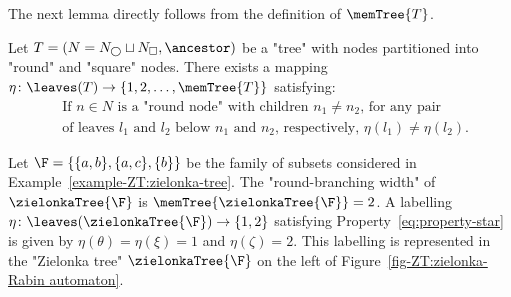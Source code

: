 \documentclass{theoretics}
\begin{document}
The next lemma directly follows from the definition of $\memTree{T}$.
\begin{lemma}\label{lemma:property_star}
	Let $T = (N = N_{\bigcirc} \sqcup N_\Box, \ancestor)$ be a "tree" with nodes partitioned into "round" and "square" nodes.
	There exists a mapping $\eta\colon \leaves(T) \to \{1,2,\dots, \memTree{T}\}$ satisfying:
	\begin{align}\label{eq:property-star}
		\nonumber&\text{If } n \in N \text{ is a "round node" with children } n_1 \neq n_2 \text{, for any pair}\\
		\tag{$\star$}&\text{of leaves } l_1 \text{ and } l_2 \text{ below } n_1 \text{ and } n_2 \text{, respectively, } \eta(l_1)\neq \eta(l_2).
	\end{align}
\end{lemma}



\begin{example}
	Let $\F=\{ \{a,b\}, \{a,c\}, \{b\}\}$ be the family of subsets considered in Example~\ref{example-ZT:zielonka-tree}. 
	The "round-branching width" of $\zielonkaTree{\F}$ is  $\memTree{\zielonkaTree{\F}} =2$. A labelling $\eta\colon \leaves(\zielonkaTree{\F}) \to \{1,2\}$ satisfying Property~\ref{eq:property-star} is given by $\eta(\theta) = \eta(\xi) = 1$ and $\eta(\zeta) = 2$.
	This labelling is represented in the "Zielonka tree" $\zielonkaTree{\F}$ on the left of Figure~\ref{fig-ZT:zielonka-Rabin automaton}.
\end{example}
\end{document}
